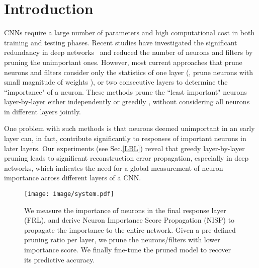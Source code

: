 \documentclass[10pt,twocolumn,letterpaper]{article}
\begin{document}
\section{Introduction}%
CNNs require a large number of parameters and high computational cost in both training and testing phases. 
Recent studies have investigated the significant redundancy in deep networks~\cite{PredictingParameters}%
and reduced the number of neurons and filters \cite{random,DeepCompress,pruneweigth,thinet} by pruning the unimportant ones.
However, most current approaches that prune neurons and filters consider only the statistics of one layer (\eg, prune neurons with small magnitude of weights \cite{pruneweigth,DeepCompress}), or two consecutive layers \cite{thinet} to determine the ``importance" of a neuron. These methods prune the ``least important" neurons layer-by-layer either independently \cite{DeepCompress} or greedily \cite{pruneweigth, thinet}, without considering all neurons in different layers jointly.

One problem with such methods is that neurons deemed unimportant in an early layer can, in fact, contribute significantly to responses of important neurons in later layers. Our experiments (see Sec.\ref{LBL}) reveal that greedy layer-by-layer pruning leads to significant reconstruction error propagation, especially in deep networks, which indicates the need for a global measurement of neuron importance across different layers of a CNN.

\begin{figure}[t]
\begin{center}
   \texttt{[image: image/system.pdf]}
\end{center}
   \caption{We measure the importance of neurons in the final response layer (FRL), and derive Neuron Importance Score Propagation (NISP) to propagate the importance to the entire network. Given a pre-defined pruning ratio per layer, we prune the neurons/filters with lower importance score. We finally fine-tune the pruned model to recover its predictive accuracy.}
\label{fig:spe}
\end{figure}
\end{document}
